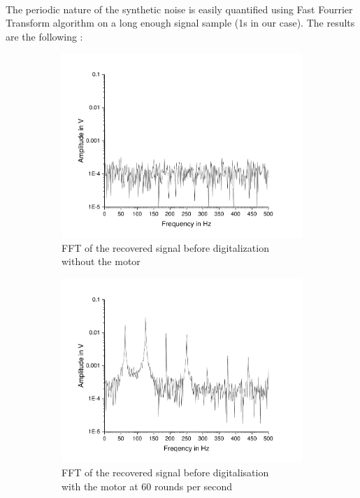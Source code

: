 \documentclass{article}[12pt]
\begin{document}
\paragraph{}
The periodic nature of the synthetic noise is easily quantified using Fast Fourrier Transform algorithm on a long enough signal sample (1s in our case).
The results are the following :
\begin{figure}[H]
\centering
\begin{subfigure}{.5\textwidth}
  \centering
  \includegraphics[width=\linewidth]{figures/nomotornofilter.pdf}
  \caption{FFT of the recovered signal before digitalization\\ without the motor}
  \label{fig:nomotornofilter}
\end{subfigure}%
\begin{subfigure}{.5\textwidth}
  \centering
  \includegraphics[width=\linewidth]{figures/motornofilter.pdf}
  \caption{FFT of the recovered signal before digitalisation\\ with the motor at 60 rounds per second}
  \label{fig:motornofilter}
\end{subfigure}
\caption{}
\label{fig:nofilterFFT}
\end{figure}
\end{document}
